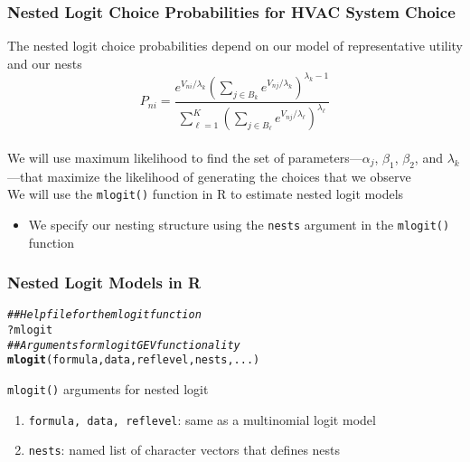 \documentclass{beamer}\usepackage[]{graphicx}\usepackage[]{color}
\makeatletter
\newcommand{\hlcom}[1]{\textcolor[rgb]{0.678,0.584,0.686}{\textit{#1}}}%
\newcommand{\hlopt}[1]{\textcolor[rgb]{0,0,0}{#1}}%
\newcommand{\hlstd}[1]{\textcolor[rgb]{0.345,0.345,0.345}{#1}}%
\newcommand{\hlkwd}[1]{\textcolor[rgb]{0.737,0.353,0.396}{\textbf{#1}}}%
\newenvironment{kframe}{%
 \def\at@end@of@kframe{}%
 \ifinner\ifhmode%
  \def\at@end@of@kframe{\end{minipage}}%
  \begin{minipage}{\columnwidth}%
 \fi\fi%
 \def\FrameCommand##1{\hskip\@totalleftmargin \hskip-\fboxsep
 \colorbox{shadecolor}{##1}\hskip-\fboxsep
     \hskip-\linewidth \hskip-\@totalleftmargin \hskip\columnwidth}%
 \MakeFramed {\advance\hsize-\width
   \@totalleftmargin\z@ \linewidth\hsize
   \@setminipage}}%
 {\par\unskip\endMakeFramed%
 \at@end@of@kframe}
\newenvironment{knitrout}{}{} %
\makeatother
\begin{document}
\begin{frame}\frametitle{Nested Logit Choice Probabilities for HVAC System Choice}
    The nested logit choice probabilities depend on our model of representative utility and our nests
    $$P_{ni} = \frac{e^{V_{ni} / \lambda_k} \left( \sum_{j \in B_k} e^{V_{nj} / \lambda_k} \right)^{\lambda_k - 1}}{\sum_{\ell = 1}^K \left( \sum_{j \in B_{\ell}} e^{V_{nj} / \lambda_{\ell}} \right)^{\lambda_{\ell}}}$$ \\
    \vspace{2ex}
    We will use maximum likelihood to find the set of parameters---$\alpha_j$, $\beta_1$, $\beta_2$, and $\lambda_k$---that maximize the likelihood of generating the choices that we observe \\
    \vspace{2ex}
    We will use the \texttt{mlogit()} function in R to estimate nested logit models
	\begin{itemize}
		\item We specify our nesting structure using the \texttt{nests} argument in the \texttt{mlogit()} function
	\end{itemize}
\end{frame}

\begin{frame}[fragile]\frametitle{Nested Logit Models in R}
\begin{knitrout}\footnotesize
{}\color{fgcolor}\begin{kframe}
\begin{alltt}
\hlcom{## Help file for the mlogit function}
\hlopt{?}\hlstd{mlogit}
\hlcom{## Arguments for mlogit GEV functionality}
\hlkwd{mlogit}\hlstd{(formula, data, reflevel, nests, ...)}
\end{alltt}
\end{kframe}
\end{knitrout}
    \vspace{2ex}
    \texttt{mlogit()} arguments for nested logit
    \begin{enumerate}
        \item \texttt{formula, data, reflevel}: same as a multinomial logit model
        \item \texttt{nests}: named list of character vectors that defines nests
    \end{enumerate}
\end{frame}
\end{document}
